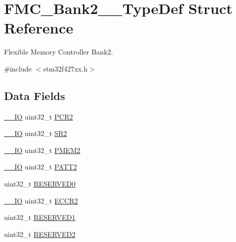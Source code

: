 \hypertarget{struct_f_m_c___bank2__3___type_def}{}\section{F\+M\+C\+\_\+\+Bank2\+\_\+\_\+\+Type\+Def Struct Reference}
\label{struct_f_m_c___bank2__3___type_def}


Flexible Memory Controller Bank2.  




{\ttfamily \#include $<$stm32f427xx.\+h$>$}

\subsection*{Data Fields}
\begin{DoxyCompactItemize}
\item 
\hyperlink{core__sc300_8h_aec43007d9998a0a0e01faede4133d6be}{\+\_\+\+\_\+\+IO} uint32\+\_\+t \hyperlink{struct_f_m_c___bank2__3___type_def_ab0cb1d704ee64c62ad5be55522a2683a}{P\+C\+R2}
\item 
\hyperlink{core__sc300_8h_aec43007d9998a0a0e01faede4133d6be}{\+\_\+\+\_\+\+IO} uint32\+\_\+t \hyperlink{struct_f_m_c___bank2__3___type_def_a89623ee198737b29dc0a803310605a83}{S\+R2}
\item 
\hyperlink{core__sc300_8h_aec43007d9998a0a0e01faede4133d6be}{\+\_\+\+\_\+\+IO} uint32\+\_\+t \hyperlink{struct_f_m_c___bank2__3___type_def_a2e5a7a96de68a6612affa6df8c309c3d}{P\+M\+E\+M2}
\item 
\hyperlink{core__sc300_8h_aec43007d9998a0a0e01faede4133d6be}{\+\_\+\+\_\+\+IO} uint32\+\_\+t \hyperlink{struct_f_m_c___bank2__3___type_def_a9c1bc909ec5ed32df45444488ea6668b}{P\+A\+T\+T2}
\item 
uint32\+\_\+t \hyperlink{struct_f_m_c___bank2__3___type_def_af86c61a5d38a4fc9cef942a12744486b}{R\+E\+S\+E\+R\+V\+E\+D0}
\item 
\hyperlink{core__sc300_8h_aec43007d9998a0a0e01faede4133d6be}{\+\_\+\+\_\+\+IO} uint32\+\_\+t \hyperlink{struct_f_m_c___bank2__3___type_def_a05a47a1664adc7a3db3fa3e83fe883b4}{E\+C\+C\+R2}
\item 
uint32\+\_\+t \hyperlink{struct_f_m_c___bank2__3___type_def_ac4ac04e673b5b8320d53f7b0947db902}{R\+E\+S\+E\+R\+V\+E\+D1}
\item 
uint32\+\_\+t \hyperlink{struct_f_m_c___bank2__3___type_def_a4c9b972a304c0e08ca27cbe57627c496}{R\+E\+S\+E\+R\+V\+E\+D2}
\item 

\end{DoxyCompactItemize}
